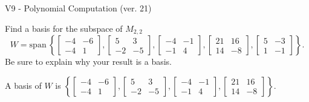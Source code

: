 \begin{exercise}
  \begin{exerciseTitle}V9 - Polynomial Computation (ver. 21)\end{exerciseTitle}
  \begin{exerciseStatement}
    Find a basis for the subspace of \(M_{2,2}\) 
\[W=\mathrm{span}\ \left\{\left[\begin{array}{cc}
-4 & -6 \\
-4 & 1
\end{array}\right] , \left[\begin{array}{cc}
5 & 3 \\
-2 & -5
\end{array}\right] , \left[\begin{array}{cc}
-4 & -1 \\
-1 & 4
\end{array}\right] , \left[\begin{array}{cc}
21 & 16 \\
14 & -8
\end{array}\right] , \left[\begin{array}{cc}
5 & -3 \\
1 & -1
\end{array}\right]\right\}.\]
 Be sure to explain why your result is a basis.


  \end{exerciseStatement}
  \begin{exerciseAnswer}
   A basis of \(W\) is  \(\left\{\left[\begin{array}{cc}
-4 & -6 \\
-4 & 1
\end{array}\right] , \left[\begin{array}{cc}
5 & 3 \\
-2 & -5
\end{array}\right] , \left[\begin{array}{cc}
-4 & -1 \\
-1 & 4
\end{array}\right] , \left[\begin{array}{cc}
21 & 16 \\
14 & -8
\end{array}\right]\right\}\).
  


  \end{exerciseAnswer}
\end{exercise}